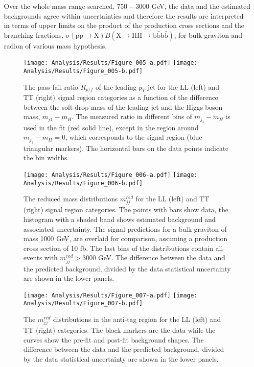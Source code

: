 Over the whole mass range searched, $750-3000$ GeV, the data and the estimated backgrounds agree within uncertainties and therefore the results are interpreted in terms of upper limits on the product of the production cross sections and the branching fractions, $\sigma(\mathrm{pp}\rightarrow \mathrm{X})B(\mathrm{X}\rightarrow\mathrm{HH}\rightarrow\mathrm{b\bar{b}b\bar{b}})$, for bulk graviton and radion of various mass hypothesis.

\begin{figure}[h!]
\centering
\texttt{[image: Analysis/Results/Figure\_005-a.pdf]}
\texttt{[image: Analysis/Results/Figure\_005-b.pdf]}
\caption{The pass-fail ratio $R_{p/f}$ of the leading $p_{T}$ jet for the LL (left) and TT (right) signal region categories as a function of the difference between the soft-drop mass of the leading jet and the Higgs boson mass, $m_{j1}-m_{H}$. The measured ratio in different bins of $m_{j_{1}}-m_{H}$  is used in the fit (red solid line), except in the region around $m_{j_{1}}-m_{H}=0$, which corresponds to the signal region (blue triangular markers). The horizontal bars on the data points indicate the bin widths.}
\label{fig:AlphaRpf}
\end{figure}

\begin{figure}[h!]
\centering
\texttt{[image: Analysis/Results/Figure\_006-a.pdf]}
\texttt{[image: Analysis/Results/Figure\_006-b.pdf]}
\caption{The reduced mass distributions $m_{jj}^{red}$ for the LL (left) and TT (right) signal region categories. The points with bars show data, the histogram with a shaded band shows estimated background and associated uncertainty. The signal predictions for a bulk graviton of mass 1000 GeV, are overlaid for comparison, assuming a production cross section of 10 fb. The last bins of the distributions contain all events with $m_{jj}^{red} > 3000$ GeV. The difference between the data and the predicted background, divided by the data statistical uncertainty are shown in the lower panels.}
\label{fig:Alpha}
\end{figure}

\begin{figure}[h!]
\centering
\texttt{[image: Analysis/Results/Figure\_007-a.pdf]}
\texttt{[image: Analysis/Results/Figure\_007-b.pdf]}
\caption{The $m_{jj}^{red}$ distributions in the anti-tag region for the LL (left) and TT (right) categories. The black markers are the data while the curves show the pre-fit and post-fit background shapes. The difference between the data and the predicted background, divided by the data statistical uncertainty are shown in the lower panels.}
\label{fig:AABH_AT}
\end{figure}

